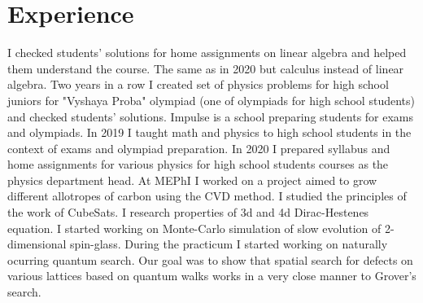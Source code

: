 \documentclass[11pt,a4paper,sans]{moderncv}        %
\begin{document}
\section{Experience}
{I checked students' solutions for home assignments on linear algebra and helped them understand the course.} 
{The same as in 2020 but calculus instead of linear algebra.}
{Two years in a row I created set of physics problems for high school juniors for "Vyshaya Proba" olympiad (one of olympiads for high school students) and checked students' solutions.}
{Impulse is a school preparing students for exams and olympiads. In 2019 I taught math and physics to high school students in the context of exams and olympiad preparation. In 2020 I prepared syllabus and home assignments for various physics for high school students courses as the physics department head.} 
{At MEPhI I worked on a project aimed to grow different allotropes of carbon using the CVD method.} 
{I studied the principles of the work of CubeSats.} 
{I research properties of 3d and 4d Dirac-Hestenes equation.}
{I started working on Monte-Carlo simulation of slow evolution of 2-dimensional spin-glass.}
{During the practicum I started working on naturally ocurring quantum search. Our goal was to show that spatial search for defects on various lattices based on quantum walks works in a very close manner to Grover's search.}
\end{document}
